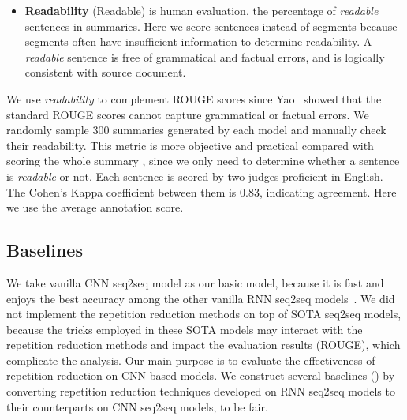 \begin{itemize}
\item \textbf{Readability} (Readable) is human evaluation, 
the percentage of
\textit{readable} sentences in summaries.
Here we score sentences instead of segments because segments often have
insufficient information to determine readability.
A \textit{readable} sentence is free of grammatical and 
factual errors, 
and is logically consistent with source document.
\end{itemize}

We use \textit{readability} to complement ROUGE scores 
since Yao~\cite{Yao} showed that the standard 
ROUGE scores cannot capture grammatical or factual errors. 
We randomly sample 300 summaries generated by each model
and manually check their readability. 
This metric is more objective and practical compared with
scoring the whole summary \cite{D18-1205}, since we only need 
to determine whether a sentence is {\em readable} or not.
Each sentence is scored by two judges proficient in English. 
The Cohen's Kappa coefficient between them is $0.83$, 
indicating agreement. Here we use the average annotation score.

\subsection{Baselines}
We take vanilla CNN seq2seq model as our basic model,
because it is fast and enjoys the best accuracy among
the other vanilla RNN seq2seq models~\cite{bai2018empirical,gehring2017convs2s}.
We did not implement the repetition reduction methods 
on top of SOTA seq2seq models,
because the tricks employed in these SOTA models may 
interact with the repetition reduction methods 
and impact the evaluation results (ROUGE), which complicate the analysis.
Our main purpose is to evaluate the effectiveness of repetition reduction
on CNN-based models.
We construct several baselines () 
by converting
repetition reduction techniques developed on RNN seq2seq models to their
counterparts on CNN seq2seq models,
to be fair.

